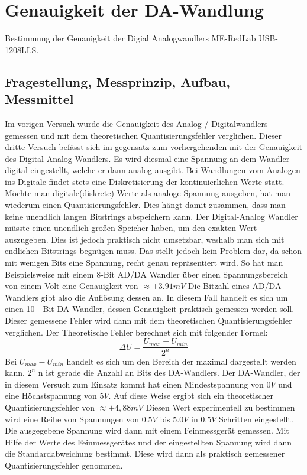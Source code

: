 %
%
\chapter{Genauigkeit der DA-Wandlung}
\label{chap:VERSUCH_3}
 Bestimmung der Genauigkeit der Digial Analogwandlers ME-RedLab USB-1208LLS.
\section{Fragestellung, Messprinzip, Aufbau, Messmittel}
\label{chap:VERSUCH_3_FRAGESTELLUNG}
Im vorigen Versuch wurde die Genauigkeit des Analog / Digitalwandlers gemessen und mit dem 
theoretischen Quantisierungsfehler verglichen. Dieser dritte Versuch befässt sich
im gegensatz zum vorhergehenden mit der Genauigkeit des Digital-Analog-Wandlers.
Es wird diesmal eine Spannung an dem Wandler digital eingestellt, welche er dann analog ausgibt.
Bei Wandlungen vom Analogen ins Digitale findet stets eine Diskretisierung der kontinuierlichen Werte statt.
Möchte man digitale(diskrete) Werte als analoge Spannung ausgeben, hat man wiederum einen Quantisierungsfehler.
Dies hängt damit zusammen, dass man keine unendlich langen Bitstrings abspeichern kann.
Der Digital-Analog Wandler müsste einen unendlich großen Speicher haben, um den exakten Wert auszugeben.
Dies ist jedoch praktisch nicht umsetzbar, weshalb man sich mit endlichen Bitstrings begnügen muss. Das stellt jedoch kein Problem dar, da schon mit wenigen Bits eine Spannung, recht genau repräsentiert wird. 
So hat man Beispielsweise mit einem 8-Bit AD/DA Wandler über einen Spannungsbereich von einem Volt eine Genauigkeit von
$\approx \pm 3.91 mV$
Die Bitzahl eines AD/DA - Wandlers gibt also die Auflösung dessen an.
In diesem Fall handelt es sich um einen 10 - Bit DA-Wandler, dessen Genauigkeit 
praktisch gemessen werden soll. Dieser gemessene Fehler wird dann mit dem theoretischen Quantisierungsfehler verglichen.
Der Theoretische Fehler berechnet sich mit folgender Formel:
\begin{equation}
\Delta U = \frac{U_{max} - U_{min}}{2^n}
\end{equation}
Bei $U_{max} - U_{min}$ handelt es sich um den Bereich der maximal dargestellt werden kann. $2^n$ n ist gerade die Anzahl an Bits des DA-Wandlers.
Der DA-Wandler, der in diesem Versuch zum Einsatz kommt hat einen Mindestspannung von $0 V$ und eine Höchstspannung von $5 V$. Auf diese Weise ergibt sich ein theoretischer Quantisierungsfehler von $ \approx \pm 4,88 mV$
Diesen Wert experimentell zu bestimmen wird eine Reihe von Spannungen von $0.5 V$ bis $5.0 V$ in $0.5 V$ Schritten eingestellt. Die ausgegebene Spannung wird dann mit einem Feinmessgerät gemessen. Mit Hilfe der Werte des Feinmessgerätes und der eingestellten Spannung wird dann die Standardabweichung bestimmt. Diese wird dann als praktisch gemessener Quantisierungsfehler genommen.


